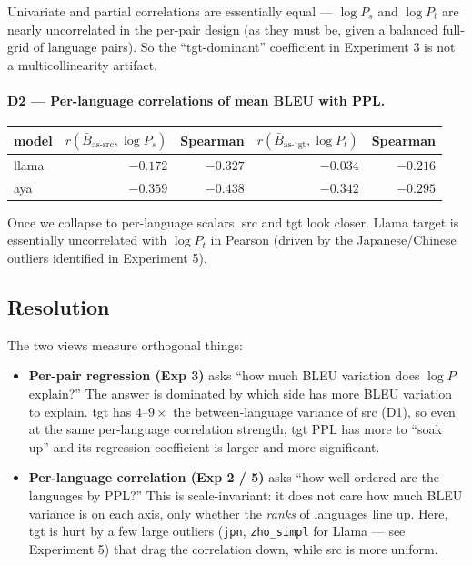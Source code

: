\documentclass[11pt]{article}
\newcommand{\code}[1]{\texttt{\small #1}}
\begin{document}
Univariate and partial correlations are essentially equal --- $\log P_s$
and $\log P_t$ are nearly uncorrelated in the per-pair design (as they
must be, given a balanced full-grid of language pairs). So the
``tgt-dominant'' coefficient in Experiment 3 is not a multicollinearity
artifact.

\paragraph{D2 --- Per-language correlations of mean BLEU with PPL.}

\begin{center}
\small
\begin{tabular}{lrrrr}
\toprule
model & $r(\bar B_{\text{as-src}}, \log P_s)$ & Spearman & $r(\bar B_{\text{as-tgt}}, \log P_t)$ & Spearman \\
\midrule
llama & $-0.172$ & $-0.327$ & $-0.034$ & $-0.216$ \\
aya   & $-0.359$ & $-0.438$ & $-0.342$ & $-0.295$ \\
\bottomrule
\end{tabular}
\end{center}

Once we collapse to per-language scalars, src and tgt look closer. Llama
target is essentially uncorrelated with $\log P_t$ in Pearson (driven by
the Japanese/Chinese outliers identified in Experiment 5).

\subsection{Resolution}

The two views measure orthogonal things:

\begin{itemize}
  \item \textbf{Per-pair regression (Exp 3)} asks ``how much BLEU
    variation does $\log P$ explain?'' The answer is dominated by which
    side has more BLEU variation to explain. tgt has $4$--$9\times$ the
    between-language variance of src (D1), so even at the same per-language
    correlation strength, tgt PPL has more to ``soak up'' and its
    regression coefficient is larger and more significant.
  \item \textbf{Per-language correlation (Exp 2 / 5)} asks ``how
    well-ordered are the languages by PPL?'' This is scale-invariant: it
    does not care how much BLEU variance is on each axis, only whether the
    \emph{ranks} of languages line up. Here, tgt is hurt by a few large
    outliers (\code{jpn}, \code{zho\_simpl} for Llama --- see Experiment 5)
    that drag the correlation down, while src is more uniform.
\end{itemize}
\end{document}
